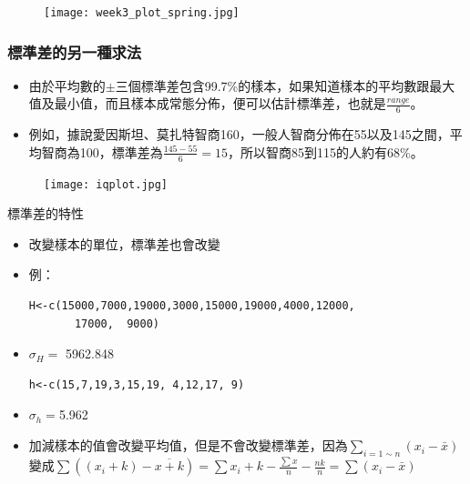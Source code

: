 \documentclass{beamer}
\begin{document}
\begin{frame}\frametitle{}
\begin{figure}
\begin{center}
\texttt{[image: week3\_plot\_spring.jpg]}
\end{center}
\end{figure}
\end{frame}
\begin{frame}\frametitle{標準差的另一種求法}
\begin{itemize}
\item 由於平均數的$\pm$三個標準差包含99.7\%的樣本，如果知道樣本的平均數跟最大值及最小值，而且樣本成常態分佈，便可以估計標準差，也就是$\frac{range}{6}$。
\item 例如，據說愛因斯坦、莫扎特智商160，一般人智商分佈在55以及145之間，平均智商為100，標準差為$\frac{145-55}{6}=15$，所以智商85到115的人約有68\%。
\end{itemize} 
\begin{figure}
\begin{center}
\texttt{[image: iqplot.jpg]}
\end{center}
\end{figure}
\end{frame}
\begin{frame}[fragile]{標準差的特性}
\begin{itemize}
\item 改變樣本的單位，標準差也會改變
\item 例：
\begin{verbatim}
H<-c(15000,7000,19000,3000,15000,19000,4000,12000,
       17000,  9000)
\end{verbatim}
\item $\sigma_{H}=$ 5962.848
\begin{verbatim}
h<-c(15,7,19,3,15,19, 4,12,17, 9)
\end{verbatim}
\item $\sigma_{h}=$5.962
\item 加減樣本的值會改變平均值，但是不會改變標準差，因為$\sum_{i=1\sim n} (x_{i}-\bar{x})$變成$\sum ((x_{i}+k)-\overline{x+k})=\sum x_{i}+k-\frac{\sum x}{n}-\frac{nk}{n}=\sum (x_{i}-\bar{x})$
\end{itemize}
\end{frame}
\end{document}
